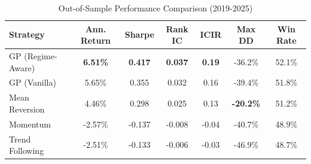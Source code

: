 
\begin{table}[h]
\centering
\caption{Out-of-Sample Performance Comparison (2019-2025)}
\label{tab:results}
\begin{tabular}{lcccccc}
\toprule
Strategy & Ann. Return & Sharpe & Rank IC & ICIR & Max DD & Win Rate \\
\midrule
GP (Regime-Aware) & \textbf{6.51\%} & \textbf{0.417} & \textbf{0.037} & \textbf{0.19} & -36.2\% & 52.1\% \\
GP (Vanilla) & 5.65\% & 0.355 & 0.032 & 0.16 & -39.4\% & 51.8\% \\
Mean Reversion & 4.46\% & 0.298 & 0.025 & 0.13 & \textbf{-20.2\%} & 51.2\% \\
Momentum & -2.57\% & -0.137 & -0.008 & -0.04 & -40.7\% & 48.9\% \\
Trend Following & -2.51\% & -0.133 & -0.006 & -0.03 & -46.9\% & 48.7\% \\
\bottomrule
\end{tabular}
\end{table}
